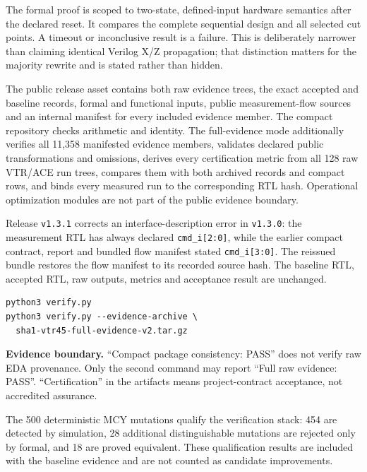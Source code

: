 \documentclass[10pt,a4paper]{article}
\begin{document}
The formal proof is scoped to two-state, defined-input hardware semantics after the declared reset. It compares the complete sequential design and all selected cut points. A timeout or inconclusive result is a failure. This is deliberately narrower than claiming identical Verilog X/Z propagation; that distinction matters for the majority rewrite and is stated rather than hidden.

The public release asset contains both raw evidence trees, the exact accepted and baseline records, formal and functional inputs, public measurement-flow sources and an internal manifest for every included evidence member. The compact repository checks arithmetic and identity. The full-evidence mode additionally verifies all 11,358 manifested evidence members, validates declared public transformations and omissions, derives every certification metric from all 128 raw VTR/ACE run trees, compares them with both archived records and compact rows, and binds every measured run to the corresponding RTL hash. Operational optimization modules are not part of the public evidence boundary.

Release \texttt{v1.3.1} corrects an interface-description error in \texttt{v1.3.0}: the measurement RTL has always declared \texttt{cmd\_i[2:0]}, while the earlier compact contract, report and bundled flow manifest stated \texttt{cmd\_i[3:0]}. The reissued bundle restores the flow manifest to its recorded source hash. The baseline RTL, accepted RTL, raw outputs, metrics and acceptance result are unchanged.

\begin{lstlisting}
python3 verify.py
python3 verify.py --evidence-archive \
  sha1-vtr45-full-evidence-v2.tar.gz
\end{lstlisting}

\begin{claimbox}
\textbf{Evidence boundary.} ``Compact package consistency: PASS'' does not verify raw EDA provenance. Only the second command may report ``Full raw evidence: PASS''. ``Certification'' in the artifacts means project-contract acceptance, not accredited assurance.
\end{claimbox}

The 500 deterministic MCY mutations qualify the verification stack: 454 are detected by simulation, 28 additional distinguishable mutations are rejected only by formal, and 18 are proved equivalent. These qualification results are included with the baseline evidence and are not counted as candidate improvements.
\end{document}
